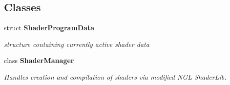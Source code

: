 \subsection*{Classes}
\begin{DoxyCompactItemize}
\item 
struct {\bf Shader\-Program\-Data}
\begin{DoxyCompactList}\small\item\em structure containing currently active shader data \end{DoxyCompactList}\item 
class {\bf Shader\-Manager}
\begin{DoxyCompactList}\small\item\em Handles creation and compilation of shaders via modified N\-G\-L Shader\-Lib. \end{DoxyCompactList}\end{DoxyCompactItemize}

